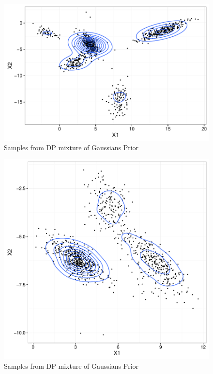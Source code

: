 \documentclass[12pt]{article}
\begin{document}
\begin{figure}
\centering
\includegraphics{plots/DP_GMM1.pdf}
\caption{Samples from DP mixture of Gaussians Prior}
\end{figure}

\begin{figure}
\centering
\includegraphics{plots/DP_GMM2.pdf}
\caption{Samples from DP mixture of Gaussians Prior}
\end{figure}

%
%
\end{document}
